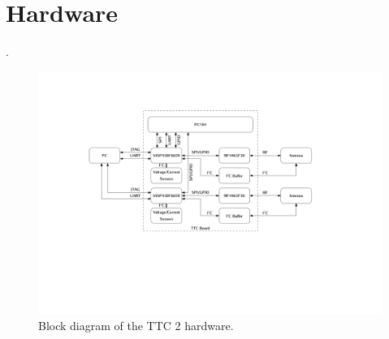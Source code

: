 %
%
%
%
%

%
%
%
%
%
%

\chapter{Hardware} \label{ch:hardware}

.

\begin{figure}[!h]
	\begin{center}
		\includegraphics[width=\textwidth]{figures/hardware_diagram.pdf}
		\caption{Block diagram of the TTC 2 hardware.}
		\label{fig:hardware-diagram}
	\end{center}
\end{figure}
